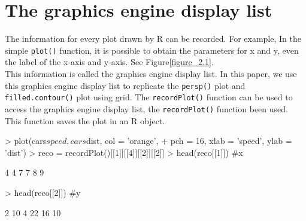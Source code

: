 \documentclass[paper=a4, fontsize=11pt]{report}
\begin{document}
\chapter{The graphics engine display list}
The information for every plot drawn by R can be recorded. For example, In the simple \texttt{plot()} function, it is possible to obtain the parameters for x and y, even the label of the x-axis and y-axis. See Figure\ref{figure_2.1}.\\

This information is called the graphics engine display list. In this paper, we use this graphics engine display list to replicate the \texttt{persp()} plot and \texttt{filled.contour()} plot using grid. The \texttt{recordPlot()} function can be used to access the graphics engine display list, the \texttt{recordPlot()} function been used. This function saves the plot in an R object. 

\begin{Schunk}
\begin{Sinput}
> plot(cars$speed, cars$dist, col = 'orange', 
+       pch = 16, xlab = 'speed', ylab = 'dist')
> reco = recordPlot()[[1]][[4]][[2]][[2]]
> head(reco[[1]]) #x
\end{Sinput}
\begin{Soutput}
[1] 4 4 7 7 8 9
\end{Soutput}
\begin{Sinput}
> head(reco[[2]]) #y
\end{Sinput}
\begin{Soutput}
[1]  2 10  4 22 16 10
\end{Soutput}
\end{Schunk}
\end{document}
